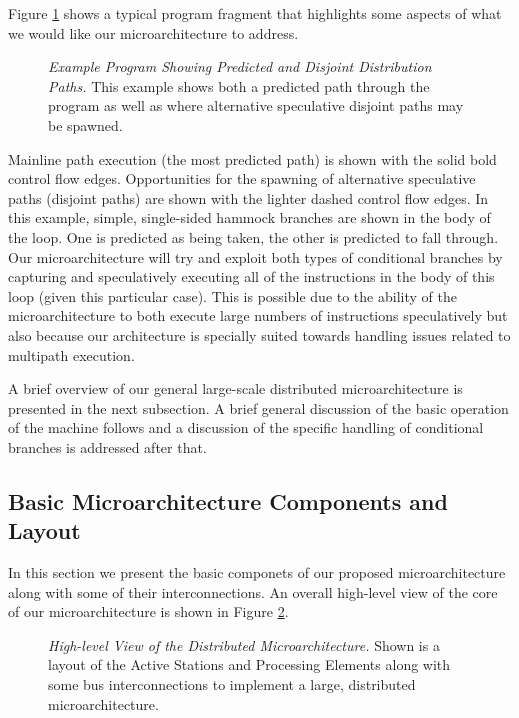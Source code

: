 \documentclass[10pt,dvips]{article}
\begin{document}
Figure \ref{fig:disjoint} shows a typical program fragment that
highlights some aspects of what we would like our microarchitecture
to address.

\begin{figure}
\centering
{}
\caption{{\em Example Program Showing Predicted and Disjoint Distribution 
Paths.} 
This example shows both a predicted path through the program as
well as where alternative speculative disjoint paths may be
spawned.}
\label{fig:disjoint}
\end{figure}

Mainline path execution (the most predicted path) is shown with the
solid bold control flow edges.  Opportunities for the spawning of alternative
speculative paths (disjoint paths) are shown with the lighter dashed
control flow edges.  In this example, simple, single-sided hammock 
branches are shown in the body of the loop.  One is predicted as
being taken, the other is predicted to fall through.  Our microarchitecture
will try and exploit both types of conditional branches by capturing
and speculatively executing
all of the instructions in the body of this loop (given this particular
case).  This is possible due to the ability of the microarchitecture to
both execute large numbers of instructions speculatively but also
because our architecture is specially suited towards handling
issues related to multipath execution.

A brief overview of our general
large-scale distributed microarchitecture is presented in the next
subsection.  A brief general discussion of the basic operation
of the machine follows and a discussion of the specific handling
of conditional branches is addressed after that.
%
\subsection{Basic Microarchitecture Components and Layout}
%
In this section we present the basic componets of our proposed
microarchitecture along with some of their interconnections.
An overall high-level view of the core of our microarchitecture is shown in 
Figure \ref{fig:window}.

\begin{figure}
\vspace{0.2 in}
\setlength{\epsfxsize}{10cm}%
\centerline{}
\caption{{\em High-level View of the Distributed Microarchitecture.} 
Shown is a layout of the Active Stations and Processing Elements
along with some bus interconnections to implement a large,
distributed microarchitecture.}
\label{fig:window}
\end{figure}
\end{document}
